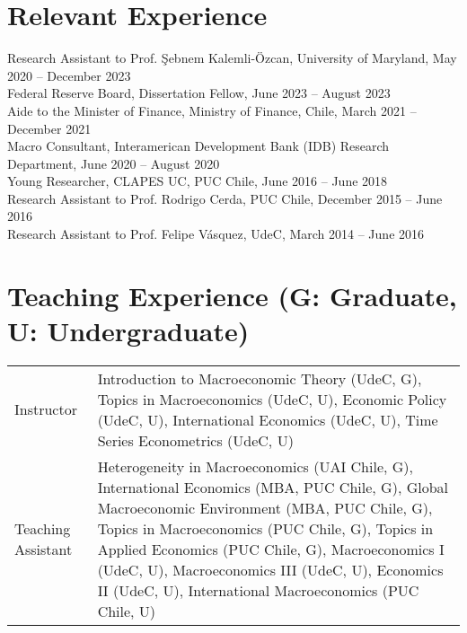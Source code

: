 \documentclass[10pt]{article}
\begin{document}




\section*{Relevant Experience}
Research Assistant to Prof. \c{S}ebnem Kalemli-\"{O}zcan, University of Maryland, May 2020 -- December 2023\\
Federal Reserve Board, Dissertation Fellow, June 2023 -- August 2023 \\
Aide to the Minister of Finance, Ministry of Finance, Chile, March 2021 -- December 2021 \\
Macro Consultant, Interamerican Development Bank (IDB) Research Department, June 2020 -- August 2020\\
Young Researcher, CLAPES UC, PUC Chile, June 2016 -- June 2018\\
Research Assistant to Prof. Rodrigo Cerda, PUC Chile, December 2015 -- June 2016\\
Research Assistant to Prof. Felipe V\'asquez, UdeC, March 2014 -- June 2016



\section*{Teaching Experience (\footnotesize G: Graduate, U: Undergraduate)}


\begin{tabular}{@{}lp{13cm}}
Instructor& Introduction to Macroeconomic Theory (UdeC, G), Topics in Macroeconomics (UdeC, U), Economic Policy (UdeC, U), International Economics (UdeC, U), Time Series Econometrics (UdeC, U)\\
Teaching Assistant& Heterogeneity in Macroeconomics (UAI Chile, G), International Economics (MBA, PUC Chile, G), Global Macroeconomic Environment (MBA, PUC Chile, G), Topics in Macroeconomics (PUC Chile, G), Topics in Applied Economics (PUC Chile, G), Macroeconomics I (UdeC, U), Macroeconomics III (UdeC, U), Economics II (UdeC, U), International Macroeconomics (PUC Chile, U)
\end{tabular}
\end{document}
